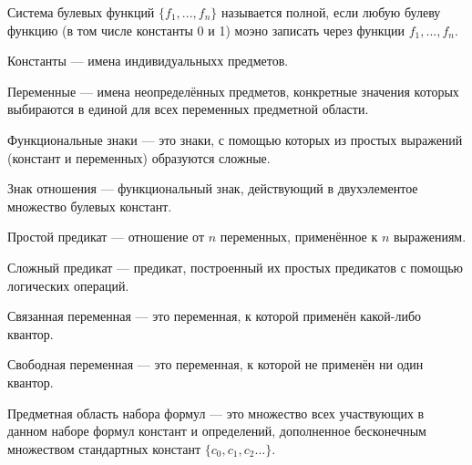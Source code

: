 \opred

Система булевых функций $\{f_1,...,f_n\}$ называется полной, если любую булеву функцию (в том числе константы 0 и 1) моэно записать через функции $f_1,...,f_n$.


\opred

Константы --- имена индивидуальныхх предметов.

\opred

Переменные --- имена неопределённых предметов, конкретные значения которых выбираются в единой для всех переменных предметной области.

\opred

Функциональные знаки --- это знаки, с помощью которых из простых выражений (констант и переменных) образуются сложные.

\opred

Знак отношения --- функциональный знак, действующий в двухэлементое множество булевых констант.

\opred

Простой предикат --- отношение от $n$ переменных, применённое к $n$ выражениям.

\opred

Сложный предикат --- предикат, построенный их простых предикатов с помощью логических операций.

\opred

Связанная переменная --- это переменная, к которой применён какой-либо квантор.

\opred

Свободная переменная --- это переменная, к которой не применён ни один квантор.

\opred

Предметная область набора формул --- это множество всех участвующих в данном наборе формул констант и определений, дополненное бесконечным множеством стандартных констант $\{c_0, c_1, c_2 ...\}$.



